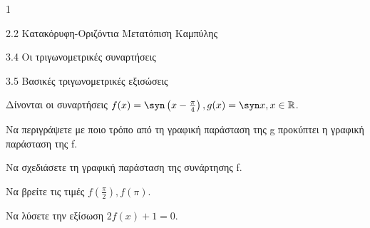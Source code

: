 \begin{ylh}{1}
\item 2.2 Κατακόρυφη-Οριζόντια Μετατόπιση Καμπύλης
\item 3.4 Οι τριγωνομετρικές συναρτήσεις
\item 3.5 Βασικές τριγωνομετρικές εξισώσεις
\end{ylh}
Δίνονται οι συναρτήσεις $f(x) = \syn \left(x - \frac{\pi}{4}\right), g(x) = \syn  x, x \in \mathbb{R}$.
\begin{alist}
\item Να περιγράψετε με ποιο τρόπο από τη γραφική παράσταση της g προκύπτει η γραφική παράσταση της f.
\item Να σχεδιάσετε τη γραφική παράσταση της συνάρτησης f.
\item Να βρείτε τις τιμές $f\left(\frac{\pi}{2}\right), f(\pi)$.
\item Να λύσετε την εξίσωση $2f(x) + 1 = 0$.
\end{alist}

